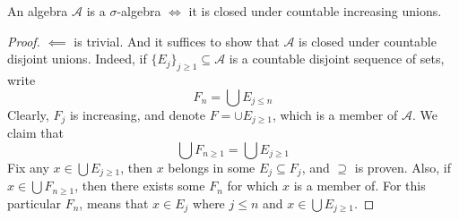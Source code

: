 \documentclass[../../main.tex]{subfiles}
\begin{document}
\begin{wts}
    An algebra $\mathcal{A}$ is a $\sigma$-algebra $\iff$ it is closed under countable increasing unions.
\end{wts}
\begin{proof}
    $\impliedby$ is trivial. And it suffices to show that $\mathcal{A}$ is closed under countable disjoint unions. Indeed, if $\{E_j\}_{j\geq 1}\subseteq \mathcal{A}$ is a countable disjoint sequence of sets, write
    \[
    F_n=\bigcup E_{j\leq n}
    \]
    Clearly, $F_j$ is increasing, and denote $F=\cup E_{j\geq 1}$, which is a member of $\mathcal{A}$. We claim that
    \[
    \bigcup F_{n\geq 1}=\bigcup E_{j\geq 1}
    \]
    Fix any $x\in\bigcup E_{j\geq 1}$, then $x$ belongs in some $E_j\subseteq F_j$, and $\supseteq$ is proven. Also, if $x\in\bigcup F_{n\geq 1}$, then there exists some $F_n$ for which $x$ is a member of. For this particular $F_n$, means that $x\in E_j$ where $j\leq n$ and $x\in \bigcup E_{j\geq 1}$.
\end{proof}
\newpage
\end{document}
